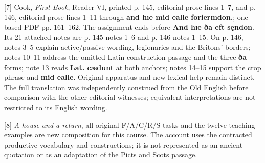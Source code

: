 [7] Cook, \emph{First Book}, Reader VI, printed p. 145, editorial prose lines 1–7, and p. 146, editorial prose lines 1–11 through \textbf{and hīe mid ealle foriermdon.}; one-based PDF pp. 161–162. The assignment ends before \textbf{And hīe ðā eft sęndon}. Its 21 attached notes are p. 145 notes 1–6 and p. 146 notes 1–15. On p. 146, notes 3–5 explain active/\allowbreak{}passive wording, legionaries and the Britons' borders; notes 10–11 address the omitted Latin construction passage and the three \textbf{ðā} forms; note 13 reads \textbf{Lat. cædunt} at both anchors; notes 14–15 support the crop phrase and \textbf{mid ealle}. Original apparatus and new lexical help remain distinct. The full translation was independently construed from the Old English before comparison with the other editorial witnesses; equivalent interpretations are not restricted to its English wording.

[8] \emph{A house and a return}, all original F/\allowbreak{}A/\allowbreak{}C/\allowbreak{}R/\allowbreak{}S tasks and the twelve teaching examples are new composition for this course. The account uses the contracted productive vocabulary and constructions; it is not represented as an ancient quotation or as an adaptation of the Picts and Scots passage.

\endgroup

\par\label{end-ch12-key}
\clearpage\endgroup
